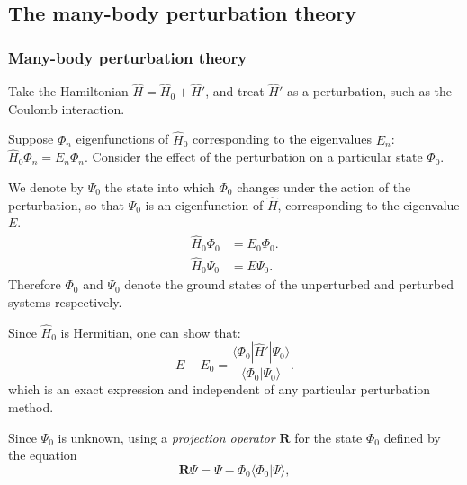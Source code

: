 \documentclass[xcolor=pdftex,hyperref={pdfpagelabels=false},table]{beamer}
\begin{document}
\subsection{The many-body perturbation theory}
\begin{frame}
\frametitle{Many-body perturbation theory}
\begin{scriptsize}
Take the Hamiltonian  $\hat{H}=\hat{H}_0+\hat{H}'$, and treat $\hat{H}'$ as a perturbation, such as the Coulomb interaction.

Suppose $\Phi_n$ eigenfunctions of $\hat{H}_0$ corresponding to the eigenvalues $E_n$: $\hat{H}_0 \Phi_n = E_n \Phi_n$.
Consider the effect of the perturbation on a particular state $\Phi_0$.

We denote by $\Psi_0$ the state into which $\Phi_0$ changes under the action of the perturbation, so that $\Psi_0$ is an eigenfunction of $\hat{H}$, corresponding to the eigenvalue $E$.
\begin{align}
 \hat{H}_0 \Phi_0 &= E_0 \Phi_0. \\
\hat{H}_0 \Psi_0 &= E \Psi_0.
\end{align}
Therefore $\Phi_0$ and $\Psi_0$ denote the ground states of the unperturbed and perturbed systems respectively.

Since $\hat{H}_0$ is Hermitian, one can show that:
\begin{equation}
E-E_0 = \frac{\langle \Phi_0 |\hat{H}'| \Psi_0 \rangle}{\langle \Phi_0 |\Psi_0 \rangle}.
\end{equation}
which is an exact expression and independent of any particular perturbation method.

Since $\Psi_0$ is unknown, using a \textit{projection operator} $\mathbf{R}$ for the state $\Phi_0$ defined by the equation
\begin{equation}
\mathbf{R} \Psi = \Psi - \Phi_0 \langle \Phi_0 | \Psi\rangle,
\end{equation}
\end{scriptsize}
\end{frame}
\end{document}
